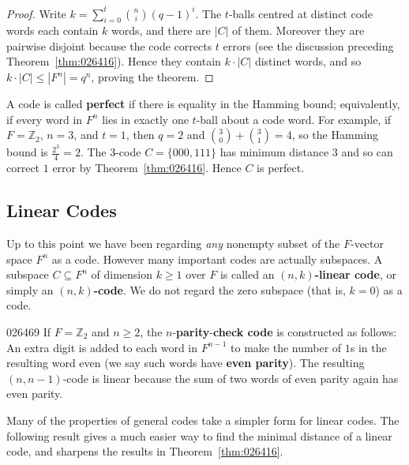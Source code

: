 \begin{proof}
Write $k = \sum_{i = 0}^{t} \binom{n}{i}(q - 1)^i$. The $t$-balls centred at distinct code words each contain $k$ words, and there are $|C|$ of them. Moreover they are pairwise disjoint because the code corrects $t$ errors (see the discussion preceding Theorem~\ref{thm:026416}). Hence they contain $k \cdot |C|$ distinct words, and so $k \cdot |C| \leq |F^{n}| = q^{n}$, proving the theorem.
\end{proof}

A code is called \textbf{perfect} if there is equality in the Hamming bound; equivalently, if every word in $F^{n}$ lies in exactly one $t$-ball about a code word. For example, if $F = \mathbb{Z}_2$, $n = 3$, and $t = 1$, then $q = 2$ and $\binom{3}{0} + \binom{3}{1} = 4$, so the Hamming bound is $\frac{2^3}{4} = 2$. The 3-code $C = \{000, 111\}$ has minimum distance $3$ and so can correct $1$ error by Theorem~\ref{thm:026416}. Hence $C$ is perfect.

\subsection*{Linear Codes}

Up to this point we have been regarding \textit{any} nonempty subset of the $F$-vector space $F^{n}$ as a code. However many important codes are actually subspaces. A subspace $C \subseteq F^n$ of dimension $k \geq 1$ over $F$ is called an $(n, k)$\textbf{-linear code}, or simply an $(n, k)$\textbf{-code}. We do not regard the zero subspace (that is, $k = 0$) as a code.

\begin{example}{}{026469}
If $F = \mathbb{Z}_2$ and $n \geq 2$, the $n$-\textbf{parity}-\textbf{check code} is
constructed as follows: An extra digit is added to each word in $F^{n-1}$ to make the number of $1$s in the resulting word even (we say such words have \textbf{even parity}). The resulting $(n, n - 1)$-code is linear because the sum of two words of even parity again has even parity.
\end{example}

Many of the properties of general codes take a simpler form for linear codes. The following result gives a much easier way to find the minimal distance of a linear code, and sharpens the results in Theorem~\ref{thm:026416}.

